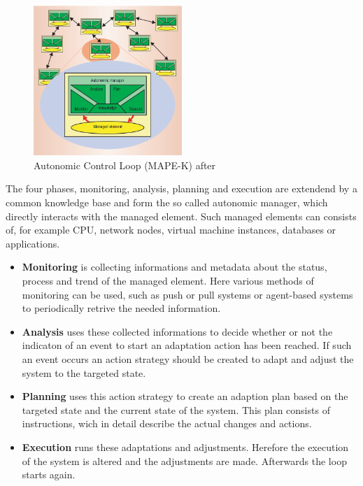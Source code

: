 \begin{figure}[ht]
\begin{center}
\includegraphics[width=0.5\textwidth]{chapters/chapter4/fig/mape2.png}
\end{center}
\caption{Autonomic Control Loop (MAPE-K) after \cite{kephart2003vision}}
\label{fig:SLA_Structure}
\end{figure}

The four phases, monitoring, analysis, planning and execution are extendend by a common knowledge base and form the so called autonomic manager, which directly interacts with the managed element. Such managed elements can consists of, for example CPU, network nodes, virtual machine instances, databases or applications. 

\begin{itemize} 
\item \textbf{Monitoring} is collecting informations and metadata about the status, process and trend of the managed element. Here 
various methods of monitoring can be used, such as push or pull systems or agent-based systems to periodically retrive the needed information.  
\item \textbf{Analysis} uses these collected informations to decide whether or not the indicaton of an event to start an adaptation action has been reached. If such an event occurs an action strategy should be created to adapt and adjust the system to the targeted state.
\item \textbf{Planning} uses this action strategy to create an adaption plan based on the targeted state and the current state of the system. This plan consists of instructions, wich in detail describe the actual changes and actions.
\item \textbf{Execution} runs these adaptations and adjustments. Herefore the execution of the system is altered and the adjustments are made. Afterwards the loop starts again.
\end{itemize} 

